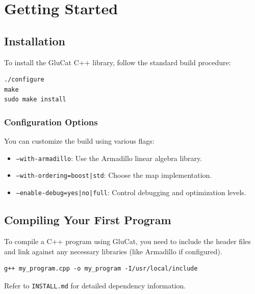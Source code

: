 \chapter{Getting Started}
\label{ch:getting_started_glucat}

\section{Installation}
To install the GluCat C++ library, follow the standard build procedure:

\begin{verbatim}
./configure
make
sudo make install
\end{verbatim}

\subsection{Configuration Options}
You can customize the build using various flags:
\begin{itemize}
    \item \texttt{--with-armadillo}: Use the Armadillo linear algebra library.
    \item \texttt{--with-ordering=boost|std}: Choose the map implementation.
    \item \texttt{--enable-debug=yes|no|full}: Control debugging and optimization levels.
\end{itemize}

\section{Compiling Your First Program}
To compile a C++ program using GluCat, you need to include the header files and link against any necessary libraries (like Armadillo if configured).
\begin{verbatim}
g++ my_program.cpp -o my_program -I/usr/local/include
\end{verbatim}
Refer to \texttt{INSTALL.md} for detailed dependency information.
